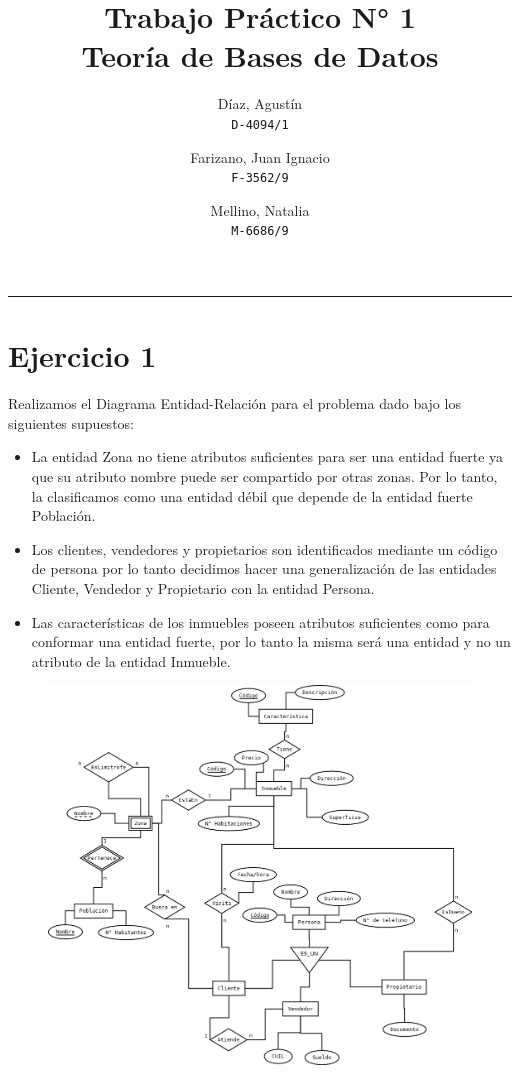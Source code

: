 \documentclass[11pt, fleqn]{article}
\title{%
    Trabajo Práctico N° 1 \\
    \large Teoría de Bases de Datos}
\author{Díaz, Agustín \\
        \texttt{D-4094/1}
        \and
        Farizano, Juan Ignacio \\
        \texttt{F-3562/9}
        \and
        Mellino, Natalia \\
        \texttt{M-6686/9}}
\date{}
\begin{document}
\maketitle
\noindent\rule{\textwidth}{1pt}

\section*{Ejercicio 1}

Realizamos el Diagrama Entidad-Relación para el problema dado bajo los siguientes supuestos: 

\begin{itemize} 
    \item La entidad Zona no tiene atributos suficientes para ser una entidad fuerte
          ya que su atributo nombre puede ser compartido por otras zonas. Por lo tanto, 
          la clasificamos como una entidad débil que depende de la entidad fuerte Población.
    \item Los clientes, vendedores y propietarios son identificados mediante un código de persona
          por lo tanto decidimos hacer una generalización de las entidades
          Cliente, Vendedor y Propietario con la entidad Persona.
    \item Las características de los inmuebles poseen atributos suficientes como para conformar una
          entidad fuerte, por lo tanto la misma será una entidad y no un atributo de la entidad Inmueble. 
\end{itemize}

\begin{figure}[h!]
      \begin{center}
          \includegraphics[width=0.75\linewidth]{DER.png}
      \end{center}
\end{figure}
\end{document}
